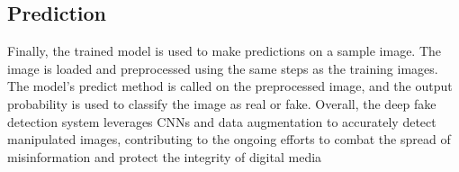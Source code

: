 \subsection{Prediction}

Finally, the trained model is used to make predictions on a sample image. The
image is loaded and preprocessed using the same steps as the training
images. The model's predict method is called on the preprocessed image, and
the output probability is used to classify the image as real or fake.
Overall, the deep fake detection system leverages CNNs and data
augmentation to accurately detect manipulated images, contributing to the
ongoing efforts to combat the spread of misinformation and protect the integrity of digital media







